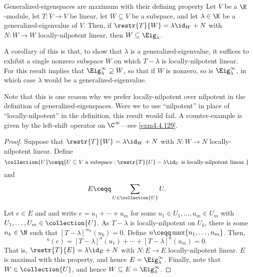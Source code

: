 \begin{prp}{Generalized-eigenspaces are maximum with their defining property}{}
	Let $V$ be a $\K$-module, let $T\colon V\rightarrow V$ be linear, let $W\subseteq V$ be a subspace, and let $\lambda \in \K$ be a generalized-eigenvalue of $V$.  Then, if $\restr{T}{W}=\lambda \id _W+N$ with $N\colon W\rightarrow W$ locally-nilpotent linear, then $W\subseteq \Eig _{\lambda}$.
	\begin{rmk}
		A corollary of this is that, to show that $\lambda$ is a generalized-eigenvalue, it suffices to exhibit a single nonzero subspace $W$ on which $T-\lambda$ is locally-nilpotent linear.  For this result implies that $\Eig _{\lambda}^{\infty}\supseteq W$, so that if $W$ is nonzero, so is $\Eig _{\lambda}^{\infty}$, in which case $\lambda$ would be a generalized-eigenvalue.
	\end{rmk}
	\begin{rmk}
		Note that this is one reason why we prefer locally-nilpotent over nilpotent in the definition of generalized-eigenspaces.  Were we to use ``nilpotent'' in place of ``locally-nilpotent'' in the definition, this result would fail.  A counter-example is given by the left-shift operator on $\C ^{\infty}$---see \cref{exm4.4.129}.
	\end{rmk}
	\begin{proof}
		Suppose that $\restr{T}{W}=\lambda \id _W+N$ with $N\colon W\rightarrow N$ locally-nilpotent linear.  Define
		\begin{equation}
		\collection{U}\ceqq \{ U\subseteq V\text{ a subspace}:\restr{T}{U}-\lambda \id _U\text{ is locally-nilpotent linear.}\} 
		\end{equation}
		and
		\begin{equation}
		E\ceqq \sum _{U\in \collection{U}}U.
		\end{equation}
		
		Let $e\in E$ and and write $e=u_1+\cdots +u_m$ for some $u_1\in U_1,\ldots ,u_m\in U_m$ with $U_1,\ldots ,U_m\in \collection{U}$.  As $T-\lambda$ is locally-nilpotent on $U_k$, there is some $n_k\in \N$ such that $[T-\lambda ]^{m_k}(u_k)=0$.  Define $n\ceqq \max \{ n_1,\ldots ,n_m\}$.  Then,
		\begin{equation}
			[T-\lambda ]^n(e)=[T-\lambda ]^n(u_1)+\cdots +[T-\lambda ]^n(u_m)=0.
		\end{equation}
		That is, $\restr{T}{E}=\lambda \id _E+N$ with $N\colon E\rightarrow E$ locally-nilpotent linear.  $E$ is maximal with this property, and hence $E=\Eig _{\lambda}^{\infty}$.  Finally, note that $W\in \collection{U}$, and hence $W\subseteq E=\Eig _{\lambda}^{\infty}$. 
	\end{proof}
\end{prp}
